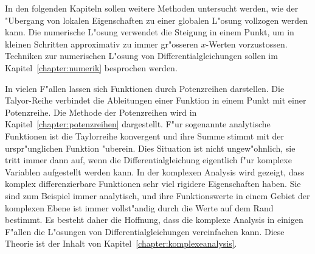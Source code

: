 In den folgenden Kapiteln sollen weitere Methoden untersucht werden,
wie der "Ubergang von lokalen Eigenschaften zu einer globalen L"osung
vollzogen werden kann.
Die numerische L"osung verwendet die Steigung in einem Punkt, um in kleinen
Schritten approximativ zu immer gr"osseren $x$-Werten vorzustossen.
Techniken zur numerischen L"osung von Differentialgleichungen sollen
im Kapitel~\ref{chapter:numerik} besprochen werden.

In vielen F"allen lassen sich Funktionen durch Potenzreihen darstellen.
Die Talyor-Reihe verbindet die Ableitungen einer Funktion in einem Punkt
mit einer Potenzreihe. 
Die Methode der Potenzreihen wird in Kapitel~\ref{chapter:potenzreihen}
dargestellt.
F"ur sogenannte analytische Funktionen ist die Taylorreihe konvergent
und ihre Summe stimmt mit der urspr"unglichen Funktion "uberein.
Dies Situation ist nicht ungew"ohnlich, sie tritt immer dann auf, wenn
die Differentialgleichung eigentlich f"ur komplexe Variablen aufgestellt
werden kann.
In der komplexen Analysis wird gezeigt, dass komplex differenzierbare
Funktionen sehr viel rigidere Eigenschaften haben.
Sie sind zum Beispiel immer analytisch, und ihre Funktionswerte in
einem Gebiet der komplexen Ebene ist immer vollst"andig durch die Werte
auf dem Rand bestimmt.
Es besteht daher die Hoffnung, dass die komplexe Analysis in einigen
F"allen die L"osungen von Differentialgleichungen vereinfachen kann.
Diese Theorie ist der Inhalt von Kapitel~\ref{chapter:komplexeanalysis}.




